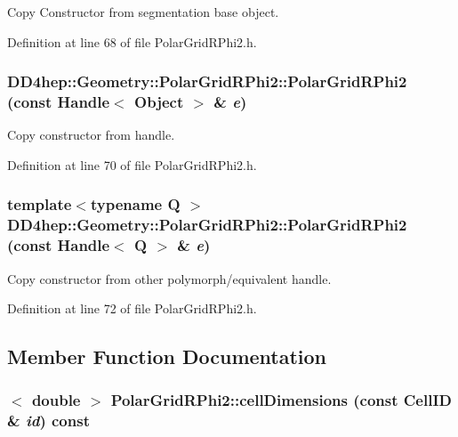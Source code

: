 Copy Constructor from segmentation base object. 

Definition at line 68 of file PolarGridRPhi2.h.\hypertarget{class_d_d4hep_1_1_geometry_1_1_polar_grid_r_phi2_aa270f3cab4cb31978e5476dc0db849f3}{
\subsubsection[{PolarGridRPhi2}]{\setlength{\rightskip}{0pt plus 5cm}DD4hep::Geometry::PolarGridRPhi2::PolarGridRPhi2 (const {\bf Handle}$<$ {\bf Object} $>$ \& {\em e})}}
\label{class_d_d4hep_1_1_geometry_1_1_polar_grid_r_phi2_aa270f3cab4cb31978e5476dc0db849f3}


Copy constructor from handle. 

Definition at line 70 of file PolarGridRPhi2.h.\hypertarget{class_d_d4hep_1_1_geometry_1_1_polar_grid_r_phi2_ab9a185d92431a79e21acf425c782ae38}{
\subsubsection[{PolarGridRPhi2}]{\setlength{\rightskip}{0pt plus 5cm}template$<$typename Q $>$ DD4hep::Geometry::PolarGridRPhi2::PolarGridRPhi2 (const {\bf Handle}$<$ Q $>$ \& {\em e})}}
\label{class_d_d4hep_1_1_geometry_1_1_polar_grid_r_phi2_ab9a185d92431a79e21acf425c782ae38}


Copy constructor from other polymorph/equivalent handle. 

Definition at line 72 of file PolarGridRPhi2.h.

\subsection{Member Function Documentation}
\hypertarget{class_d_d4hep_1_1_geometry_1_1_polar_grid_r_phi2_a4955e146ca59fb57fbb9bf999de56c4c}{
\subsubsection[{cellDimensions}]{$<$ double $>$ PolarGridRPhi2::cellDimensions (const CellID \& {\em id}) const}}
\label{class_d_d4hep_1_1_geometry_1_1_polar_grid_r_phi2_a4955e146ca59fb57fbb9bf999de56c4c}


